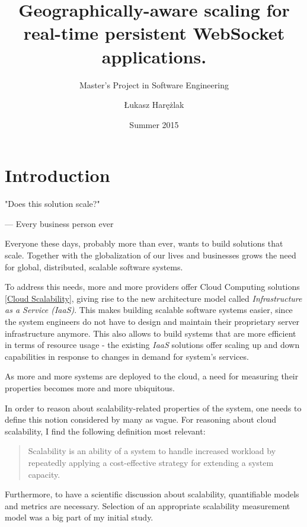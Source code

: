 \documentclass{uvamscse}
\title{Geographically-aware scaling for real-time persistent WebSocket applications.}
\subtitle{Master's Project in Software Engineering}
\date{Summer 2015}
\author{Łukasz Harężlak}
\begin{document}
\maketitle


\chapter{Introduction}

\epigraph{"Does this solution scale?"}{--- Every business person ever}

Everyone these days, probably more than ever, wants to build solutions that scale. Together with the globalization of our lives and businesses grows the need for global, distributed, scalable software systems.

To address this needs, more and more providers offer Cloud Computing solutions \ref{Cloud Scalability}, giving rise to the new architecture model called \textit{Infrastructure as a Service (IaaS)}. This makes building scalable software systems easier, since the system engineers do not have to design and maintain their proprietary server infrastructure anymore. This also allows to build systems that are more efficient in terms of resource usage - the existing \textit{IaaS} solutions offer scaling up and down capabilities in response to changes in demand for system's services.

As more and more systems are deployed to the cloud, a need for measuring their properties becomes more and more ubiquitous.

In order to reason about scalability-related properties of the system, one needs to define this notion considered by many as vague. For reasoning about cloud scalability, I find the following definition most relevant:

\begin{quote}
\cite{WeinstockOnSystem2006} Scalability is an ability of a system to handle increased workload by repeatedly applying a cost-effective strategy for extending a system capacity.
\end{quote}

Furthermore, to have a scientific discussion about scalability, quantifiable models and metrics are necessary. Selection of an appropriate scalability measurement model was a big part of my initial study.
\end{document}
